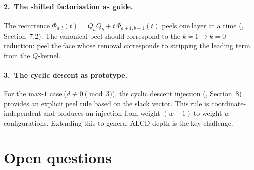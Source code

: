 \documentclass[11pt]{article}
\theoremstyle{plain}
\theoremstyle{definition}
\begin{document}
\paragraph{2.\ The shifted factorisation as guide.}
The recurrence
$\Phi_{a,b}(t) = Q_a Q_b + t\,\Phi_{a+1,b+1}(t)$ peels one
layer at a time (\cite{LOCAL_RULE}, Section~7.2).  The canonical
peel should correspond to the $k = 1 \to k = 0$ reduction:
peel the face whose removal corresponds to stripping the leading
term from the $Q$-kernel.

\paragraph{3.\ The cyclic descent as prototype.}
For the max-$1$ case ($d \not\equiv 0 \pmod{3}$), the cyclic
descent injection (\cite{NOTES}, Section~8) provides an explicit
peel rule based on the slack vector.  This rule is
coordinate-independent and produces an injection from
weight-$(w-1)$ to weight-$w$ configurations.  Extending this to
general ALCD depth is the key challenge.


\section{Open questions}
\label{sec:open}
\end{document}
